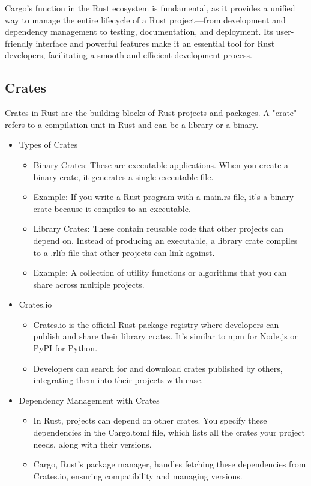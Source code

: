 Cargo's function in the Rust ecosystem is fundamental, as it provides a unified way to manage the entire lifecycle of a Rust project—from development and dependency management to testing, documentation, and deployment. Its user-friendly interface and powerful features make it an essential tool for Rust developers, facilitating a smooth and efficient development process.

\subsection{Crates}
Crates in Rust are the building blocks of Rust projects and packages. A "crate" refers to a compilation unit in Rust and can be a library or a binary.

\begin{itemize}
	
	\item Types of Crates
	\begin{itemize}
		\item Binary Crates: These are executable applications. When you create a binary crate, it generates a single executable file.
		\item Example: If you write a Rust program with a main.rs file, it’s a binary crate because it compiles to an executable.
		\item Library Crates: These contain reusable code that other projects can depend on. Instead of producing an executable, a library crate compiles to a .rlib file that other projects can link against.
		\item Example: A collection of utility functions or algorithms that you can share across multiple projects.
	\end{itemize}
	
	\item Crates.io
	\begin{itemize}
		\item Crates.io is the official Rust package registry where developers can publish and share their library crates. It's similar to npm for Node.js or PyPI for Python.
		\item Developers can search for and download crates published by others, integrating them into their projects with ease.
	\end{itemize}
	
	\item Dependency Management with Crates
	\begin{itemize}
		\item In Rust, projects can depend on other crates. You specify these dependencies in the Cargo.toml file, which lists all the crates your project needs, along with their versions.
		\item Cargo, Rust’s package manager, handles fetching these dependencies from Crates.io, ensuring compatibility and managing versions.
	\end{itemize}
	

\end{itemize}
